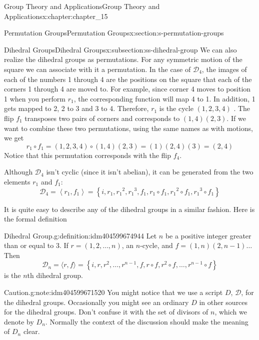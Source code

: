 \documentclass[twoside,10pt,]{book}
\numberwithin{equation}{section}
\begin{document}
\begin{chapterptx}{Group Theory and Applications}{}{Group Theory and Applications}{}{}{x:chapter:chapter_15}
\begin{sectionptx}{Permutation Groups}{}{Permutation Groups}{}{}{x:section:s-permutation-groups}
\begin{subsectionptx}{Dihedral Groups}{}{Dihedral Groups}{}{}{x:subsection:ss-dihedral-group}
We can also realize the dihedral groups as permutations.  For any symmetric motion of the square we can associate with it a permutation.  In the case of \(\mathcal{D}_4\), the images of each of the numbers 1 through 4 are the positions on the square that each of the corners 1 through 4 are moved to.  For example, since corner 4 moves to position 1 when you perform \(r_1\),  the corresponding function will map 4 to 1.   In addition, 1 gets mapped to 2, 2 to 3 and 3 to 4.  Therefore, \(r_1\) is the cycle \((1,2,3,4)\) .   The flip \(f_1\) transposes two pairs of corners and corresponds to \((1,4)(2,3)\).  If we want to combine these two permutations, using the same names as with motions, we get%
\begin{equation*}
r_1\circ f_1= (1,2,3,4)\circ (1,4)(2,3)=(1)(2,4)(3) = (2,4)
\end{equation*}
Notice that this permutation corresponds with the flip \(f_4\).%
\par
Although \(\mathcal{D}_4\) isn't cyclic (since it isn't abelian), it can be generated from the two elements \(r_1\) and \(f_1\):%
\begin{equation*}
\mathcal{D}_4= \left\langle r_1,f_1\right\rangle = \left\{i, r_1, r_1{}^2, r_1{}^3, f_1, r_1\circ f_1, r_1{}^2\circ f_1, r_1{}^3\circ f_1\right\}
\end{equation*}
%
\par
It is quite easy to describe any of the dihedral groups in a similar fashion.  Here is the formal definition%
\begin{definition}{Dihedral Group.}{g:definition:idm404599674944}%
%
\label{g:notation:idm404599673616}%
Let \(n\) be a positive integer greater than or equal to 3. If \(r= (1,2, \ldots , n)\),    an \(n\)-cycle,   and \(f= (1,n)(2,n-1)\ldots\) Then%
\begin{equation*}
\mathcal{D}_n= \langle r,f\rangle  = \left\{i, r, r^2, \ldots, r^{n-1}, f, r\circ f, r^2\circ f, \ldots, r^{n-1}\circ f\right\}
\end{equation*}
is the \(n\)th dihedral group.%
\end{definition}
\begin{note}{Caution.}{g:note:idm404599671520}%
You might notice that we use a script \(D\), \(\mathcal{D}\), for the dihedral groups.  Occasionally you might see an ordinary \(D\) in other sources for the dihedral groups.  Don't  confuse it with the set of divisors of \(n\), which we denote by \(D_n\).  Normally the context of the discussion should make the meaning of \(D_n\) clear.%

\end{note}
\end{subsectionptx}
\end{sectionptx}
\end{chapterptx}
\end{document}
